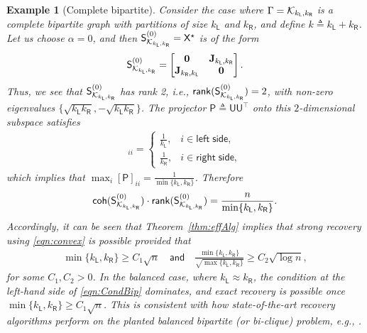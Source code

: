 \documentclass[12pt]{article}
\newtheorem{example}{Example}
\newcommand{\calK}{{\cal K}}
\newcommand{\s}[1]{\mathsf{#1}}
\begin{document}
\begin{example}[Complete bipartite]\label{exmp:bip}
Consider the case where $\Gamma=\calK_{k_{\s{L}},k_{\s{R}}}$ is a complete bipartite graph with partitions of size $k_{\s{L}}$ and $k_{\s{R}}$, and define $k\triangleq k_{\s{L}}+k_{\s{R}}$. Let us choose $\alpha=0$, and then $\s{S}_{\calK_{k_{\s{L}},k_{\s{R}}}}^{(0)} = \s{X}^\star$ is of the form
\begin{align}
\s{S}_{\calK_{k_{\s{L}},k_{\s{R}}}}^{(0)}=\begin{bmatrix} \mathbf{0} & \mathbf{J}_{k_{\s{L}},k_{\s{R}}}\\ \mathbf{J}_{k_{\s{R}},k_{\s{L}}} & \mathbf{0}\end{bmatrix}.
\end{align}
Thus, we see that $\s{S}_{\calK_{k_{\s{L}},k_{\s{R}}}}^{(0)}$ has rank 2, i.e., $\s{rank}(\s{S}^{(0)}_{\calK_{k_{\s{L}},k_{\s{R}}}})=2$, with non-zero eigenvalues $\{\sqrt{k_{\s{L}}k_{\s{R}}},-\sqrt{k_{\s{L}}k_{\s{R}}}\}$. The projector $\s{P}\triangleq\s{U}\s{U}^\top$ onto this $2$-dimensional subspace satisfies
\begin{align}
[\s{P}]_{ii}=\begin{cases}
\frac{1}{k_{\s{L}}}, & i\in \s{left}\;\s{side},\\
\frac{1}{k_{\s{R}}}, & i\in \s{right}\;\s{side},
\end{cases}
\end{align}
which implies that $\max_i[\s{P}]_{ii}=\frac{1}{\min\{k_{\s{L}},k_{\s{R}}\}}$. Therefore
\begin{align}
\s{coh}(\s{S}^{(0)}_{\calK_{k_{\s{L}},k_{\s{R}}}})\cdot\s{rank}(\s{S}^{(0)}_{\calK_{k_{\s{L}},k_{\s{R}}}})=\frac{n}{\min\{k_{\s{L}},k_{\s{R}}\}}.
\end{align}
Accordingly, it can be seen that Theorem~\ref{thm:effAlg} implies that strong recovery using \eqref{eqn:convex} is possible provided that
\begin{align}
    \min\{k_{\s{L}},k_{\s{R}}\}\geq C_1\sqrt{n}\quad\s{and}\quad\frac{\min\{k_{\s{L}},k_{\s{R}}\}}{\sqrt{\max\{k_{\s{L}},k_{\s{R}}\}}}\geq C_2\sqrt{\log n},\label{eqn:CondBip}
\end{align}
for some $C_1,C_2>0$. In the balanced case, where $k_{\s{L}}\approx k_{\s{R}}$, the condition at the left-hand side of \eqref{eqn:CondBip} dominates, and exact recovery is possible once $\min\{k_{\s{L}},k_{\s{R}}\}\geq C_1\sqrt{n}$. This is consistent with how state-of-the-art recovery algorithms perform on the planted balanced bipartite (or bi-clique) problem, e.g., \cite{Levanzov2018,Kumar2022}.
\end{example}
\end{document}
